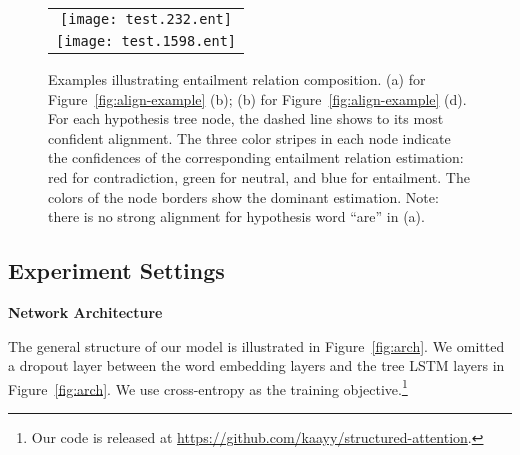 \begin{figure*}[ht]
\begin{center}
\begin{tabular}{c}
\raisebox{1.5in}{(a)}
\texttt{[image: test.232.ent]}\\
\raisebox{1.5in}{(b)}
\texttt{[image: test.1598.ent]}%
\end{tabular}
\end{center}
\caption{Examples illustrating entailment relation composition.
(a) for Figure~\ref{fig:align-example} (b); (b) for Figure~\ref{fig:align-example} (d). 
For each hypothesis tree node, the dashed line shows
to its most confident alignment.
The three color stripes in each node indicate
the confidences of the corresponding entailment relation
estimation: red for {\color{red} contradiction}, 
green for {\color{green} neutral}, and blue for {\color{blue} entailment}.
The colors of the node borders show the dominant 
estimation.
Note: there is no strong alignment for hypothesis word ``are'' in (a).
\label{fig:ent-example}}
\end{figure*}

\subsection{Experiment Settings}


{\bf Network Architecture}

The general structure of our model is illustrated 
in Figure~\ref{fig:arch}.
We omitted a dropout layer between the word embedding 
layers and the tree LSTM layers in Figure~\ref{fig:arch}.
We use cross-entropy as the training objective.\footnote{
Our code is released at \url{https://github.com/kaayy/structured-attention}.}

